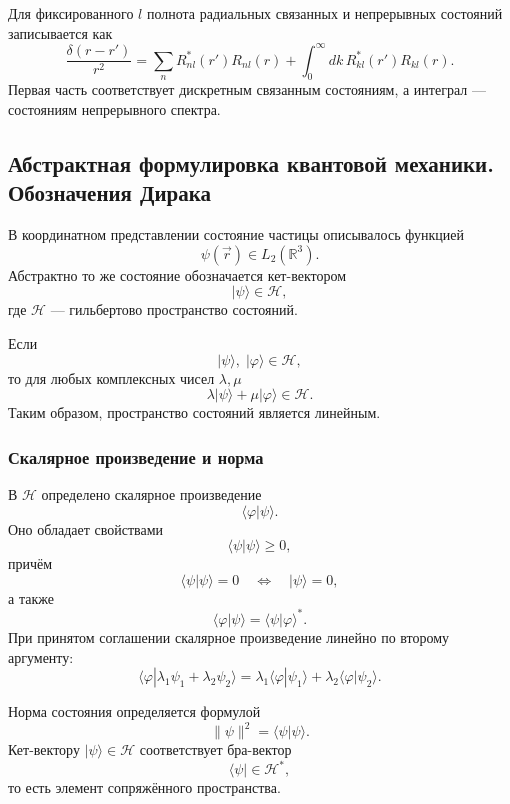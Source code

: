 \documentclass[12pt,a4paper]{article}
\begin{document}
Для фиксированного $l$ полнота радиальных связанных и непрерывных
состояний записывается как
\[
    \boxed{
    \frac{\delta(r-r')}{r^2}
    =
    \sum_n
        R_{nl}^*(r')R_{nl}(r)
    +
    \int_0^\infty
        dk\,
        R_{kl}^*(r')R_{kl}(r)
    }.
\]
Первая часть соответствует дискретным связанным состояниям, а интеграл
--- состояниям непрерывного спектра.


\subsection{Абстрактная формулировка квантовой механики. Обозначения Дирака}

В координатном представлении состояние частицы описывалось функцией
\[
    \psi(\vec r)\in L_2(\mathbb R^3).
\]
Абстрактно то же состояние обозначается кет-вектором
\[
    \boxed{
        |\psi\rangle\in\mathcal H
    },
\]
где $\mathcal H$ --- гильбертово пространство состояний.

Если
\[
    |\psi\rangle,\;|\varphi\rangle\in\mathcal H,
\]
то для любых комплексных чисел $\lambda,\mu$
\[
    \boxed{
        \lambda|\psi\rangle+\mu|\varphi\rangle
        \in\mathcal H
    }.
\]
Таким образом, пространство состояний является линейным.

\subsubsection{Скалярное произведение и норма}

В $\mathcal H$ определено скалярное произведение
\[
    \langle\varphi|\psi\rangle.
\]
Оно обладает свойствами
\[
    \langle\psi|\psi\rangle\geq0,
\]
причём
\[
    \langle\psi|\psi\rangle=0
    \quad\Longleftrightarrow\quad
    |\psi\rangle=0,
\]
а также
\[
    \boxed{
        \langle\varphi|\psi\rangle
        =
        \langle\psi|\varphi\rangle^*
    }.
\]
При принятом соглашении скалярное произведение линейно по второму
аргументу:
\[
\boxed{
\langle
\varphi
|
\lambda_1\psi_1+\lambda_2\psi_2
\rangle
=
\lambda_1\langle\varphi|\psi_1\rangle
+
\lambda_2\langle\varphi|\psi_2\rangle
}.
\]

Норма состояния определяется формулой
\[
    \boxed{
        \|\psi\|^2
        =
        \langle\psi|\psi\rangle
    }.
\]
Кет-вектору $|\psi\rangle\in\mathcal H$ соответствует бра-вектор
\[
    \langle\psi|\in\mathcal H^*,
\]
то есть элемент сопряжённого пространства.
\end{document}
